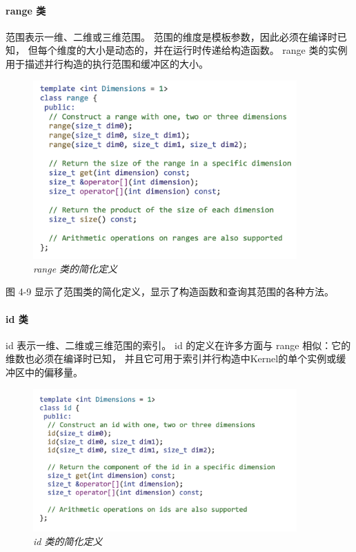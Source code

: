 \paragraph{range 类}

范围表示一维、二维或三维范围。 范围的维度是模板参数，因此必须在编译时已知，
但每个维度的大小是动态的，并在运行时传递给构造函数。 range 类的实例用于描述并行构造的执行范围和缓冲区的大小。

\begin{figure}[H]
	\centering
	\includegraphics[width=0.9\textwidth]{figs/F4.9.png}
	\caption{\textit{range 类的简化定义}}
\end{figure}

图 4-9 显示了范围类的简化定义，显示了构造函数和查询其范围的各种方法。

\paragraph{id 类}

id 表示一维、二维或三维范围的索引。 
id 的定义在许多方面与 range 相似：它的维数也必须在编译时已知，
并且它可用于索引并行构造中Kernel的单个实例或缓冲区中的偏移量。

\begin{figure}[H]
	\centering
	\includegraphics[width=0.9\textwidth]{figs/F4.10.png}
	\caption{\textit{id 类的简化定义}}
\end{figure}

